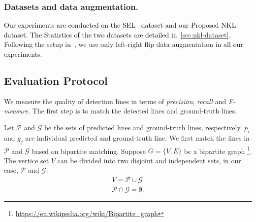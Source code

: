 \documentclass[10pt,journal,cspaper,compsoc]{IEEEtran}
\newcommand{\revise}[1]{{\textcolor{black}{#1}}}
\newcommand{\CheckRmv}[1]{}
\newcommand{\CheckRmv}[1]{#1}
\begin{document}
\CheckRmv{
\begin{figure*}[htb!]
  \centering
  \begin{overpic}[width=0.9\linewidth]{figures/search_theta_r_pami.pdf}
    \put(95,1){$\times\pi$}
    \put(45,1){$\times\sqrt{2}$}
  \end{overpic}\vspace{-10pt}
  \caption{
    Left: performance under different distance quantization intervals $\Delta r$ with a fixed
         angular quantization interval $\Delta\theta=\pi/100$.
         Larger $\Delta r$ indicates less quantization levels $R$.
    Right: performance under different angular quantization intervals $\Delta \theta$ with a fixed
        distance quantization interval $\Delta r=\sqrt{2}$.
  }\label{fig:ablation-interval}
\end{figure*}
}

\subsubsection{Datasets and data augmentation.}
\revise{Our experiments are conducted on the 
SEL~\cite{lee2017semantic} dataset and our Proposed
NKL dataset.}
%
\revise{The Statistics of the two datasets are detailed in~\cref{sec:nkl-dataset}.}
%
%
%
Following the setup in~\cite{lee2017semantic}, we use only left-right flip
data augmentation in all our experiments.

\subsection{Evaluation Protocol}
We measure the quality of detection lines in terms of \emph{precision},
\emph{recall} and \emph{F-measure}.
%
The first step is to match the detected lines and ground-truth lines.

Let $\mathcal{P}$ and $\mathcal{G}$ be the sets of predicted lines
and ground-truth lines, respectively.
%
$p_i$ and $g_j$ are individual predicted and ground-truth line.
%
We first match the lines in $\mathcal{P}$ and $\mathcal{G}$ based on bipartite matching.
%
Suppose $G = \{V, E\}$ be a bipartite graph
\footnote{\url{https://en.wikipedia.org/wiki/Bipartite_graph}}.
%
The vertice set $V$ can be divided into two disjoint and independent sets,
in our case, $\mathcal{P}$ and $\mathcal{G}$:
\begin{equation*}
  \begin{split}
    V = \mathcal{P} \cup \mathcal{G} \\    
    \mathcal{P} \cap \mathcal{G} = \emptyset.
  \end{split}
\end{equation*}
\end{document}
